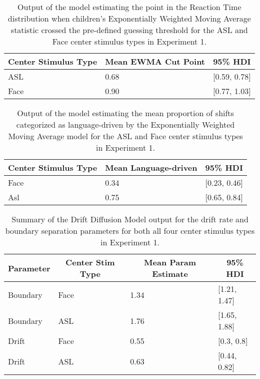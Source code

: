 \documentclass[,man,floatsintext]{apa6}
\begin{document}
\begin{appendix}
\begin{table}[h]
\begin{center}
\begin{threeparttable}
\caption{\label{tab:trio-ewma-cuts}Output of the model estimating the point in the Reaction Time distribution when children's Exponentially Weighted Moving Average statistic crossed the pre-defined guessing threshold for the ASL and Face center stimulus types in Experiment 1.}
\begin{tabular}{lll}
\toprule
Center Stimulus Type & \multicolumn{1}{c}{Mean EWMA Cut Point} & \multicolumn{1}{c}{95\% HDI}\\
\midrule
ASL & 0.68 & [0.59, 0.78]\\
Face & 0.90 & [0.77, 1.03]\\
\bottomrule
\end{tabular}
\end{threeparttable}
\end{center}
\end{table}

\begin{table}[h]
\begin{center}
\begin{threeparttable}
\caption{\label{tab:trio-guess-cuts}Output of the model estimating the mean proportion of shifts categorized as language-driven by the Exponentially Weighted Moving Average model for the ASL and Face center stimulus types in Experiment 1.}
\begin{tabular}{lll}
\toprule
Center Stimulus Type & \multicolumn{1}{c}{Mean Language-driven} & \multicolumn{1}{c}{95\% HDI}\\
\midrule
Face & 0.34 & [0.23, 0.46]\\
Asl & 0.75 & [0.65, 0.84]\\
\bottomrule
\end{tabular}
\end{threeparttable}
\end{center}
\end{table}

\begin{table}[h]
\begin{center}
\begin{threeparttable}
\caption{\label{tab:trio-hddm}Summary of the Drift Diffusion Model output for the drift rate and boundary separation parameters for both all four center stimulus types in Experiment 1.}
\begin{tabular}{llll}
\toprule
Parameter & \multicolumn{1}{c}{Center Stim Type} & \multicolumn{1}{c}{Mean Param Estimate} & \multicolumn{1}{c}{95\% HDI}\\
\midrule
Boundary & Face & 1.34 & [1.21, 1.47]\\
Boundary & ASL & 1.76 & [1.65, 1.88]\\
Drift & Face & 0.55 & [0.3, 0.8]\\
Drift & ASL & 0.63 & [0.44, 0.82]\\
\bottomrule
\end{tabular}
\end{threeparttable}
\end{center}
\end{table}


\end{appendix}
\end{document}
